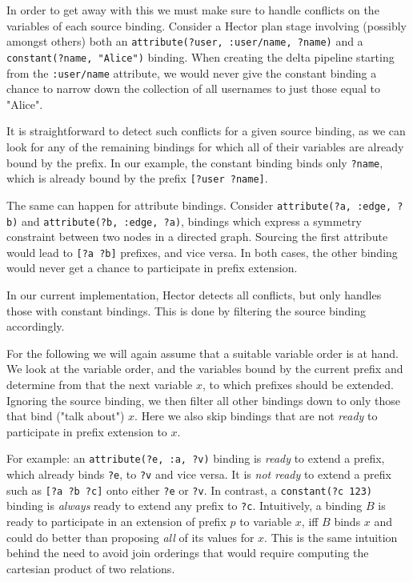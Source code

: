 \documentclass[../index.tex]{subfiles}
\begin{document}
In order to get away with this we must make sure to handle conflicts
on the variables of each source binding. Consider a Hector plan stage
involving (possibly amongst others) both an \texttt{attribute(?user,
  :user/name, ?name)} and a \texttt{constant(?name, "Alice")}
binding. When creating the delta pipeline starting from the
\texttt{:user/name} attribute, we would never give the constant
binding a chance to narrow down the collection of all usernames to
just those equal to "Alice".

It is straightforward to detect such conflicts for a given source
binding, as we can look for any of the remaining bindings for which
all of their variables are already bound by the prefix. In our
example, the constant binding binds only \texttt{?name}, which is
already bound by the prefix \texttt{[?user ?name]}.

The same can happen for attribute bindings. Consider
\texttt{attribute(?a, :edge, ?b)} and \texttt{attribute(?b, :edge,
  ?a)}, bindings which express a symmetry constraint between two nodes
in a directed graph. Sourcing the first attribute would lead to
\texttt{[?a ?b]} prefixes, and vice versa. In both cases, the other
binding would never get a chance to participate in prefix extension.

In our current implementation, Hector detects all conflicts, but only
handles those with constant bindings. This is done by filtering the
source binding accordingly.

For the following we will again assume that a suitable variable order
is at hand. We look at the variable order, and the variables bound by
the current prefix and determine from that the next variable $x$, to
which prefixes should be extended. Ignoring the source binding, we
then filter all other bindings down to only those that bind ("talk
about") $x$. Here we also skip bindings that are not \emph{ready} to
participate in prefix extension to $x$.

For example: an \texttt{attribute(?e, :a, ?v)} binding is \emph{ready}
to extend a prefix, which already binds \texttt{?e}, to \texttt{?v}
and vice versa. It is \emph{not ready} to extend a prefix such as
\texttt{[?a ?b ?c]} onto either \texttt{?e} or \texttt{?v}. In
contrast, a \texttt{constant(?c 123)} binding is \emph{always} ready
to extend any prefix to \texttt{?c}. Intuitively, a binding $B$ is
ready to participate in an extension of prefix $p$ to variable $x$,
iff $B$ binds $x$ and could do better than proposing \emph{all} of its
values for $x$. This is the same intuition behind the need to avoid
join orderings that would require computing the cartesian product of
two relations.
\end{document}

